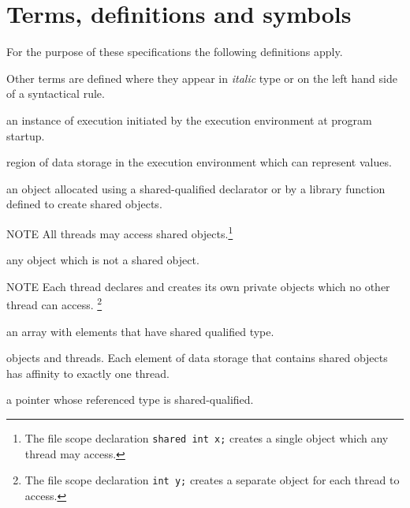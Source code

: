 

\section{Terms, definitions and symbols}

\npf For the purpose of these specifications the following
    definitions apply.

\np Other terms are defined where they appear in {\em
    italic} type or on the left hand side of a syntactical rule.

% 
     an instance of execution initiated by the execution
     environment at program startup.

%
     region of data storage in the execution environment
     which can represent values.

%
    an object allocated using a shared-qualified
    declarator or by a library function defined to create shared objects.
    
\np  NOTE \hspace{5pt}  All threads may access shared 
     objects.\footnote{The file scope declaration
     {\tt shared int x;} creates a single object which any thread may access.}
   
%
     any object which is not a shared object.

\np  NOTE \hspace{5pt} Each thread declares and creates its own 
     private objects which no other thread can access.
     \footnote{The file scope declaration
     {\tt int y;} creates a separate object for each thread to access.}

%
     an array with elements that have shared qualified type.
  
%
     objects and threads.  Each element of data storage that contains
     shared objects has affinity to exactly one thread.
 
%
     a pointer whose referenced type is shared-qualified.

